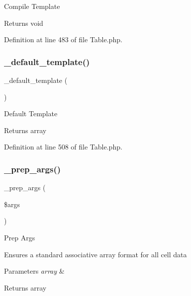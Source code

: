 Compile Template

\begin{DoxyReturn}{Returns}
void 
\end{DoxyReturn}


Definition at line 483 of file Table.\+php.

\mbox{\label{class_c_i___table_ae1990fcb9ffc455614eeac9a1091f0b0}} 
\subsubsection{\texorpdfstring{\_default\_template()}{\_default\_template()}}
{\footnotesize\ttfamily \+\_\+default\+\_\+template (\begin{DoxyParamCaption}{ }\end{DoxyParamCaption})\hspace{0.3cm}{\ttfamily [protected]}}

Default Template

\begin{DoxyReturn}{Returns}
array 
\end{DoxyReturn}


Definition at line 508 of file Table.\+php.

\mbox{\label{class_c_i___table_aec91c20b757a8a063e4147f0aebe8b1b}} 
\subsubsection{\texorpdfstring{\_prep\_args()}{\_prep\_args()}}
{\footnotesize\ttfamily \+\_\+prep\+\_\+args (\begin{DoxyParamCaption}\item[{}]{\$args }\end{DoxyParamCaption})\hspace{0.3cm}{\ttfamily [protected]}}

Prep Args

Ensures a standard associative array format for all cell data


\begin{DoxyParams}{Parameters}
{\em array} & \\
\hline
\end{DoxyParams}
\begin{DoxyReturn}{Returns}
array 
\end{DoxyReturn}


